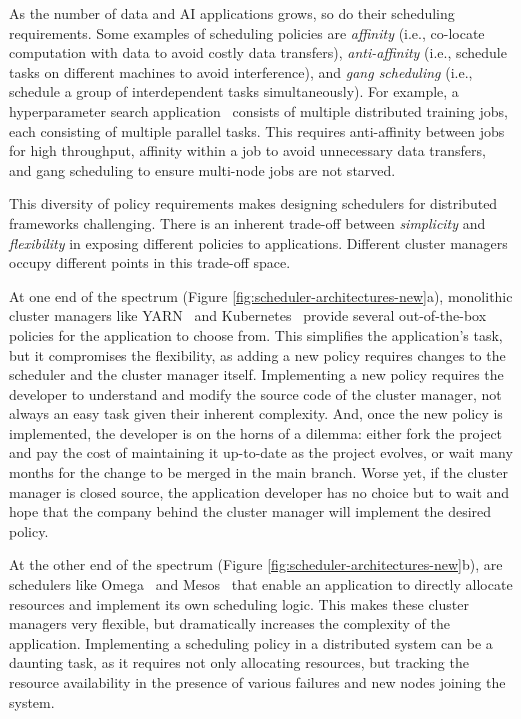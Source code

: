 As the number of data and AI applications grows, so do their scheduling requirements. 
Some examples of scheduling policies are \emph{affinity} (i.e., co-locate computation with data to avoid costly data transfers), \emph{anti-affinity}  (i.e., schedule tasks on different machines to avoid interference), 
and \emph{gang scheduling} (i.e., schedule a group of interdependent tasks simultaneously). For example, a hyperparameter search application~\cite{hypersched,gandiva} consists of multiple distributed training jobs, each consisting of multiple parallel tasks. This requires anti-affinity between jobs for high throughput, affinity within a job to avoid unnecessary data transfers, and gang scheduling to ensure multi-node jobs are not starved. 

This diversity of policy requirements makes designing schedulers for distributed frameworks challenging. There is an inherent trade-off between \emph{simplicity} and \emph{flexibility} in exposing different policies to applications. Different cluster managers occupy different points in this trade-off space. 

At one end of the spectrum (Figure \ref{fig:scheduler-architectures-new}a), monolithic cluster managers like YARN~\cite{yarn} and Kubernetes~\cite{kubernetes} provide several out-of-the-box policies for the application to choose from. This simplifies the application's task, but it compromises the flexibility, as adding a new policy requires changes to the scheduler and the cluster manager itself. Implementing a new policy requires the developer to understand and modify the source code of the cluster manager, not always an easy task given their inherent complexity. And, once the new policy is implemented, the developer is on the horns of a dilemma: either fork the project and pay the cost of maintaining it up-to-date as the project evolves, or wait many months for the change to be merged in the main branch. Worse yet, if the cluster manager is closed source, the application developer has no choice but to wait and hope that the company behind the cluster manager will implement the desired policy.

At the other end of the spectrum (Figure \ref{fig:scheduler-architectures-new}b), are schedulers like Omega~\cite{omega} and Mesos~\cite{mesos} that enable an application to directly allocate resources and implement its own scheduling logic. This makes these cluster managers very flexible, but dramatically increases the complexity of the application. Implementing a scheduling policy in a distributed system can be a daunting task, as it requires not only allocating resources, but tracking the resource availability in the presence of various failures and new nodes joining the system.

